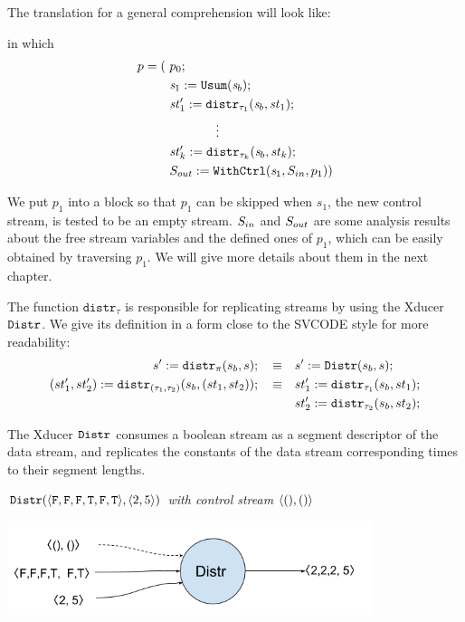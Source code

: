 The translation for a general comprehension will look like:\\[3ex]

\def\Distr#1#2#3{\mathtt{distr}_{#3}(#1,#2)}
\def\Pack#1#2#3{\mathtt{pack}_{#3}(#1,#2)}

in which $$ \begin{aligned}
p = ( & \ p_0; \\
    & \ \sdef{\s_1}{\usum(\s_b)}; \\
	& \ \sdef{\st_1'}{\Distr{\s_b}{\st_1}{\tau_1}}; \\
	& \qquad \qquad \vdots \\
	& \ \sdef{\st_k'}{\Distr{\s_b}{\st_k}{\tau_k}}; \\
	& \ \withctrl{\s_1}{p_1}{\Sin}{\Sout} ) \\
\end{aligned}$$	

We put $p_1$ into a \wc block so that $p_1$ can be skipped when $s_1$, the new control stream, is tested to be an empty stream.
$S_{in}$ and $S_{out}$  are some analysis results about the free stream variables and the defined ones of $p_1$, which can be easily obtained by traversing $p_1$. We will give more details about them in the next chapter.

The function $\mathtt{distr}_{\tau}$ is responsible for replicating streams by using the Xducer $\mathtt{Distr}$. 
We give its definition in a form close to the SVCODE style for more readability:
\begin{align*}
	s' := \Distr{s_b}{s}{\pi}; \quad \equiv & \quad s' := \distrf{s_b}{s}; \\
	(st'_1,st'_2)  := \Distr{s_b}{(st_1,st_2)}{(\tau_1,\tau_2)}; \quad \equiv & \quad st_1' := \Distr{s_b}{st_1}{\tau_1}; \\ 
	&\quad st_2' := \Distr{s_b}{st_2}{\tau_2};
\end{align*}

The Xducer $\mathtt{Distr}$ consumes a boolean stream as a segment descriptor of the data stream, and replicates the constants of the data stream corresponding times to their segment lengths.
\begin{example} \emph{$\distrf{\<\F,\F,\F,\T,\F,\T\'>}{\< 2,5 \'>}$ with control stream $\< (),() \'>$}\\
	\begin{center}
		\includegraphics[width=0.8\textwidth]{fig/distrxducer.png}
	\end{center}
\end{example}



